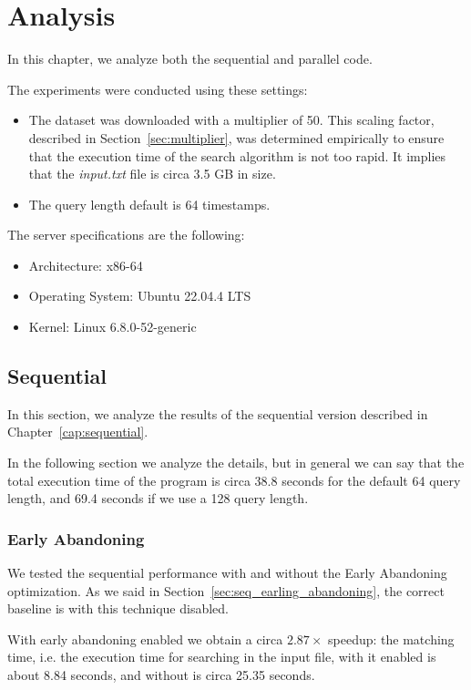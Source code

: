 \chapter{Analysis}
\label{cap:analysis}
In this chapter, we analyze both the sequential and parallel code.

The experiments were conducted using these settings:
\begin{itemize}
    \item The dataset was downloaded with a multiplier of 50. This scaling factor, described in Section~\ref{sec:multiplier}, was determined empirically to ensure that the execution time of the search algorithm is not too rapid. It implies that the \textit{input.txt} file is circa 3.5 GB in size.
    \item The query length default is 64 timestamps.
\end{itemize}

\myskip

The server specifications are the following:
\begin{itemize}
    \item Architecture: x86-64
    \item Operating System: Ubuntu 22.04.4 LTS
    \item Kernel: Linux 6.8.0-52-generic
\end{itemize}


\section{Sequential}
In this section, we analyze the results of the sequential version described in Chapter~\ref{cap:sequential}.

In the following section we analyze the details, but in general we can say that the total execution time of the program is circa 38.8 seconds for the default 64 query length, and 69.4 seconds if we use a 128 query length.

\subsection{Early Abandoning}
\label{sec:analysis_early_abandoning}
We tested the sequential performance with and without the Early Abandoning optimization. As we said in Section~\ref{sec:seq_earling_abandoning}, the correct baseline is with this technique disabled.

With early abandoning enabled we obtain a circa $2.87\times$ speedup: the matching time, i.e. the execution time for searching in the input file, with it enabled is about 8.84 seconds, and without is circa 25.35 seconds.

